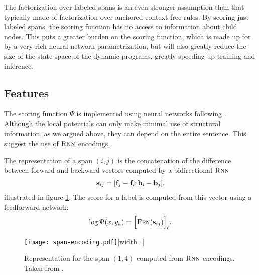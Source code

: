 The factorization over labeled spans is an even stronger assumption than that typically made of factorization over anchored context-free rules. By scoring just labeled spans, the scoring function has no access to information about child nodes. This puts a greater burden on the scoring function, which is made up for by a very rich neural network parametrization, but will also greatly reduce the size of the state-space of the dynamic programs, greatly speeding up training and inference.

\subsection{Features}
The scoring function $\Psi$ is implemented using neural networks following \citet{stern2017minimal}. Although the local potentials can only make minimal use of structural information, as we argued above, they can depend on the entire sentence. This suggest the use of $\textsc{Rnn}$ encodings.

The representation of a span $(i, j)$ is the concatenation of the difference between forward and backward vectors computed by a bidirectional $\textsc{Rnn}$
\begin{align}
  \label{eq:potential-function}
  \mathbf{s}_{ij} = [\mathbf{f}_j - \mathbf{f}_i; \mathbf{b}_i - \mathbf{b}_j],
\end{align}
illustrated in figure \ref{fig:span-feature}. The score for a label is computed from this vector using a feedforward network:
\begin{align}
  \log \Psi(x, y_a) = \Big[ \textsc{Ffn}( \mathbf{s}_{ij} ) \Big]_{\ell}.
\end{align}

\begin{figure}
  \texttt{[image: span-encoding.pdf]}[width=\textwidth]
  \caption{Representation for the span $(1, 4)$ computed from $\textsc{Rnn}$ encodings. Taken from \citet{stern2018analyis}.}
  \label{fig:span-feature}
\end{figure}

